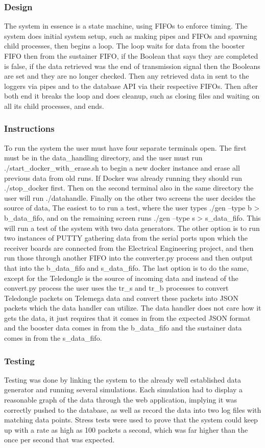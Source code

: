 \documentclass[onecolumn, draftclsnofoot,10pt, compsoc]{IEEEtran}
\begin{document}
\subsubsection{Design}
The system in essence is a state machine, using FIFOs to enforce timing. The system does initial system setup, such as making pipes and FIFOs and spawning child processes, then begins a loop. The loop waits for data from the booster FIFO then from the sustainer FIFO, if the Boolean that says they are completed is false, if the data retrieved was the end of transmission signal then the Booleans are set and they are no longer checked. Then any retrieved data in sent to the loggers via pipes and to the database API via their respective FIFOs. Then after both end it breaks the loop and does cleanup, such as closing files and waiting on all its child processes, and ends.
\subsubsection{Instructions}
To run the system the user must have four separate terminals open. The first must be in the data\_handling directory, and the user must run ./start\_docker\_with\_erase.sh to begin a new docker instance and erase all previous data from old runs. If Docker was already running they should run ./stop\_docker first. Then on the second terminal also in the same directory the user will run ./datahandle. Finally on the other two screens the user decides the source of data, The easiest to to run a test, where the user types ./gen –type b > b\_data\_fifo, and on the remaining screen runs ./gen –type s > s\_data\_fifo. This will run a test of the system with two data generators. The other option is to run two instances of PUTTY gathering data from the serial ports upon which the receiver boards are connected from the Electrical Engineering project, and then run those through another FIFO into the converter.py process and then output that into the b\_data\_fifo and s\_data\_fifo. The last option is to do the same, except for the Teledongle is the source of incoming data and instead of the convert.py process the user uses the tr\_s and tr\_b processes to convert Teledongle packets on Telemega data and convert these packets into JSON packets which the data handler can utilize. The data handler does not care how it gets the data, it just requires that it comes in from the expected JSON format and the booster data comes in from the b\_data\_fifo and the sustainer data comes in from the s\_data\_fifo.
\subsubsection{Testing}
Testing was done by linking the system to the already well established data generator and running several simulations. Each simulation had to display a reasonable graph of the data through the web application, implying it was correctly pushed to the database, as well as record the data into two log files with matching data points. Stress tests were used to prove that the system could keep up with a rate as high as 100 packets a second, which was far higher than the once per second that was expected.
\end{document}
